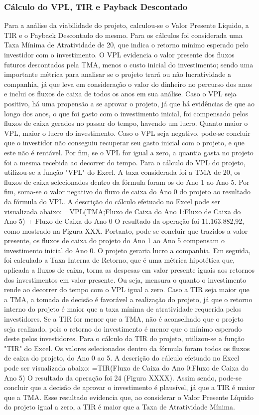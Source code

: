 \documentclass[11pt]{article}
\begin{document}
\subsubsection{\textbf{Cálculo do VPL, TIR e Payback Descontado}}
Para a análise da viabilidade do projeto, calculou-se o Valor Presente Líquido, a TIR e o Payback Descontado do mesmo. Para os cálculos foi considerada uma Taxa Mínima de Atratividade de 20, que indica o retorno mínimo esperado pelo investidor com o investimento. 
O VPL evidencia o valor presente dos fluxos futuros descontados pela TMA, menos o custo inicial do investimento; sendo uma importante métrica para analisar se o projeto trará ou não lucratividade a companhia, já que leva em consideração o valor do dinheiro no percurso dos anos e inclui os fluxos de caixa de todos os anos em sua análise. 
Caso o VPL seja positivo, há uma propensão a se aprovar o projeto, já que há evidências de que ao longo dos anos, o que foi gasto com o investimento inicial, foi compensado pelos fluxos de caixa gerados no passar do tempo, havendo um lucro. Quanto maior o VPL, maior o lucro do investimento. Caso o VPL seja negativo, pode-se concluir que o investidor não conseguiu recuperar seu gasto inicial com o projeto, e que este não é rentável. Por fim, se o VPL for igual a zero, a quantia gasta no projeto foi a mesma recebida ao decorrer do tempo. 
Para o cálculo do VPL do projeto, utilizou-se a função "VPL" do Excel. A taxa considerada foi a TMA de 20, os fluxos de caixa selecionados dentro da fórmula foram os do Ano 1 ao Ano 5. Por fim, soma-se o valor negativo do fluxo de caixa do Ano 0 do projeto ao resultado da fórmula do VPL. A descrição do cálculo efetuado no Excel pode ser visualizada abaixo:
=VPL(TMA;Fluxo de Caixa do Ano 1:Fluxo de Caixa do Ano 5) + Fluxo de Caixa do Ano 0
O resultado da operação foi 11.163.882,92, como mostrado na Figura XXX. Portanto, pode-se concluir que trazidos a valor presente, os fluxos de caixa do projeto do Ano 1 ao Ano 5 compensam o investimento inicial do Ano 0. O projeto geraria lucro a companhia.
Em seguida, foi calculado a Taxa Interna de Retorno, que é uma métrica hipotética que, aplicada a fluxos de caixa, torna as despesas em valor presente iguais aos retornos dos investimentos em valor presente. Ou seja, mensura o quanto o investimento rende ao decorrer do tempo com o VPL igual a zero. 
Caso a TIR seja maior que a TMA, a tomada de decisão é favorável a realização do projeto, já que o retorno interno do projeto é maior que a taxa mínima de atratividade requerida pelos investidores. Se a TIR for menor que a TMA, não é aconselhado que o projeto seja realizado, pois o retorno do investimento é menor que o mínimo esperado deste pelos investidores. 
Para o cálculo da TIR do projeto, utilizou-se a função "TIR" do Excel. Os valores selecionados dentro da fórmula foram todos os fluxos de caixa do projeto, do Ano 0 ao 5. A descrição do cálculo efetuado no Excel pode ser visualizada abaixo:
=TIR(Fluxo de Caixa do Ano 0:Fluxo de Caixa do Ano 5)
O resultado da operação foi 24 (Figura XXXX). Assim sendo, pode-se concluir que a decisão de aprovar o investimento é plausível, já que a TIR é maior que a TMA. Esse resultado evidencia que, ao considerar o Valor Presente Líquido do projeto igual a zero, a TIR é maior que a Taxa de Atratividade Mínima.
\end{document}
